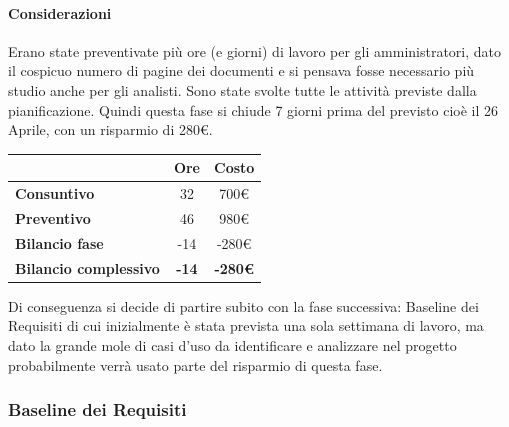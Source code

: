 \paragraph{Considerazioni} \hfill \break
Erano state preventivate più ore (e giorni) di lavoro per gli amministratori, dato il cospicuo 
numero di pagine dei documenti e si pensava fosse necessario più studio anche per gli analisti.
Sono state svolte tutte le attività previste dalla pianificazione.
Quindi questa fase si chiude 7 giorni prima del previsto cioè il 26 Aprile, con un risparmio di 280\euro. 
\begin{center}
	\renewcommand{\arraystretch}{1.8} %
	\begin{tabular}{ | l |c|c| }
    \hline
    & \textbf{Ore} & \textbf{Costo} \\
	\hline
    \textbf{Consuntivo} & 32 & 700\euro \\
    \hline
    \textbf{Preventivo} & 46 & 980\euro \\
    \hline
    \textbf{Bilancio fase} & -14 & -280\euro \\
    \hline
    \textbf{Bilancio complessivo} & \textbf{-14} & \textbf{-280\euro} \\
    \hline
    \end{tabular}
\end{center}
Di conseguenza si decide di partire subito con la fase successiva: Baseline dei Requisiti di cui inizialmente 
è stata prevista una sola settimana di lavoro, ma dato la grande mole di casi d'uso da identificare e 
analizzare nel progetto probabilmente verrà usato parte del risparmio di questa fase.

\subsubsection{Baseline dei Requisiti}

